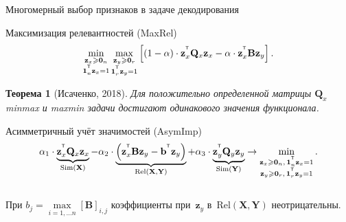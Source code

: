 \documentclass[10pt]{beamer}
\renewcommand{\geq}{\ensuremath{\geqslant}}
\newcommand{\bb}{\mathbf{b}}
\newcommand{\bz}{\mathbf{z}}
\newcommand{\bB}{\mathbf{B}}
\newcommand{\bQ}{\mathbf{Q}}
\newcommand{\bX}{\mathbf{X}}
\newcommand{\bY}{\mathbf{Y}}
\newcommand{\T}{^{\text{\tiny\sffamily\upshape\mdseries T}}}
\newcommand{\bOne}{\boldsymbol{1}}
\newcommand{\bZero}{\boldsymbol{0}}
\newtheorem{rustheorem}{Теорема}
\begin{document}
\begin{frame}{Многомерный выбор признаков в задаче декодирования}
	\begin{block}{Максимизация релевантностей (MaxRel)}
	\vspace{-0.2cm}
	\[
		\min_{\substack{\bz_x \geq \bZero_n \\ \bOne_n^{\T}\bz_x=1}} 	\max_{\substack{\bz_y \geq \bZero_r \\ \bOne_r^{\T}\bz_y=1}} \left[ (1 - \alpha) \cdot \bz_x^{\T} \bQ_x \bz_x - \alpha \cdot \bz_x^{\T} \bB \bz_y \right].
	\]
	\vspace{-0.2cm}
	\end{block}
	\begin{rustheorem}[Исаченко, 2018]
		Для положительно определенной матрицы $\bQ_x$ minmax и maxmin задачи достигают одинакового значения функционала.
	\end{rustheorem}
	\begin{block}{Асимметричный учёт значимостей (AsymImp)}
	\vspace{-0.2cm}
	\begin{equation*}
	\alpha_1 \cdot \underbrace{\bz_x^{\T} \bQ_x \bz_x}_{\text{Sim}(\bX)} - \alpha_2 \cdot  \underbrace{\left(\bz_x^{\T} \bB \bz_y - \bb^{\T} \bz_y \right) }_{\text{Rel}(\bX, \bY)} + \alpha_3 \cdot \underbrace{\bz_y^{\T} \bQ_y \bz_y}_{\text{Sim}(\bY)} \rightarrow \min_{\substack{\bz_x \geq \bZero_n, \, \bOne_n^{\T}\bz_x=1 \\ \bz_y \geq \bZero_r, \, \bOne_r^{\T}\bz_y=1}}.
	\end{equation*}
	\vspace{-0.4cm} \\
	При $b_j = \max\limits_{i=1, \dots n} [\bB]_{i, j}$ коэффициенты при~$\bz_y$ в~$\text{Rel}(\bX, \bY)$ неотрицательны.
\end{block}
\end{frame}
\end{document}
